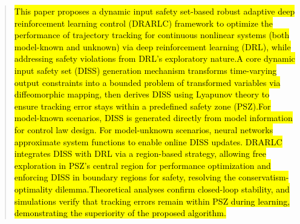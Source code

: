 \documentclass[preprint,12pt]{elsarticle}
\begin{document}
\begin{frontmatter}
\begin{abstract}

    \hl{This paper proposes a dynamic input safety set-based robust adaptive deep reinforcement learning control (DRARLC) framework to optimize  the performance of trajectory tracking for continuous nonlinear systems (both model-known and unknown) via deep reinforcement learning (DRL), while addressing safety violations from DRL's exploratory nature.​A core dynamic input safety set (DISS) generation mechanism transforms time-varying output constraints into a bounded problem of transformed variables via diffeomorphic mapping, then derives DISS using Lyapunov theory to ensure tracking error stays within a predefined safety zone (PSZ).​For model-known scenarios, DISS is generated directly from model information for control law design. For model-unknown scenarios, neural networks approximate system functions to enable online DISS updates. DRARLC integrates DISS with DRL via a region-based strategy, allowing free exploration in PSZ's central region for performance optimization and enforcing DISS in boundary regions for safety, resolving the conservatism-optimality dilemma.Theoretical analyses confirm closed-loop stability, and simulations verify that tracking errors remain within PSZ during learning, demonstrating the superiority of the proposed algorithm.}
\end{abstract}


\end{frontmatter}
\end{document}
